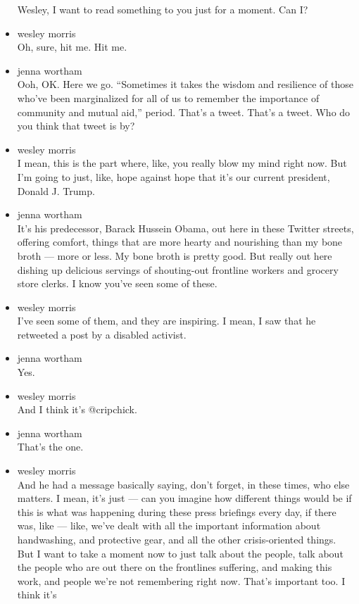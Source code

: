 \begin{itemize}
  Wesley, I want to read something to you just for a moment. Can I?
\item
  wesley morris\\
  Oh, sure, hit me. Hit me.
\item
  jenna wortham\\
  Ooh, OK. Here we go. ``Sometimes it takes the wisdom and resilience of
  those who've been marginalized for all of us to remember the
  importance of community and mutual aid,'' period. That's a tweet.
  That's a tweet. Who do you think that tweet is by?
\item
  wesley morris\\
  I mean, this is the part where, like, you really blow my mind right
  now. But I'm going to just, like, hope against hope that it's our
  current president, Donald J. Trump.
\item
  jenna wortham\\
  It's his predecessor, Barack Hussein Obama, out here in these Twitter
  streets, offering comfort, things that are more hearty and nourishing
  than my bone broth --- more or less. My bone broth is pretty good. But
  really out here dishing up delicious servings of shouting-out
  frontline workers and grocery store clerks. I know you've seen some of
  these.
\item
  wesley morris\\
  I've seen some of them, and they are inspiring. I mean, I saw that he
  retweeted a post by a disabled activist.
\item
  jenna wortham\\
  Yes.
\item
  wesley morris\\
  And I think it's @cripchick.
\item
  jenna wortham\\
  That's the one.
\item
  wesley morris\\
  And he had a message basically saying, don't forget, in these times,
  who else matters. I mean, it's just --- can you imagine how different
  things would be if this is what was happening during these press
  briefings every day, if there was, like --- like, we've dealt with all
  the important information about handwashing, and protective gear, and
  all the other crisis-oriented things. But I want to take a moment now
  to just talk about the people, talk about the people who are out there
  on the frontlines suffering, and making this work, and people we're
  not remembering right now. That's important too. I think it's

\end{itemize}
